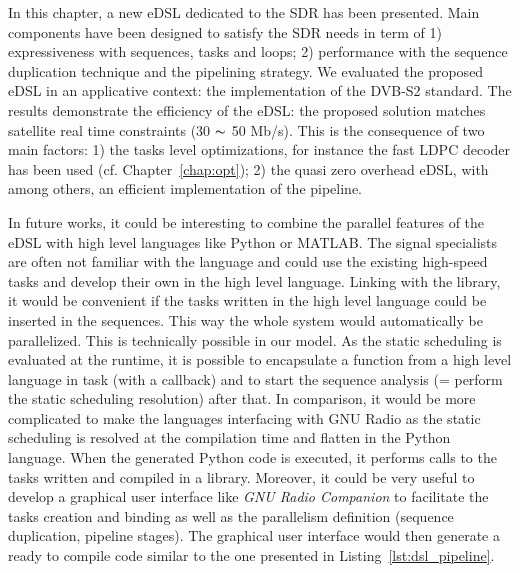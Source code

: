 In this chapter, a new eDSL dedicated to the SDR has been presented. Main
components have been designed to satisfy the SDR needs in term of 1)
expressiveness with sequences, tasks and loops; 2) performance with the sequence
duplication technique and the pipelining strategy. We evaluated the proposed
eDSL in an applicative context: the implementation of the DVB-S2 standard. The
results demonstrate the efficiency of the \AFFECT eDSL: the proposed solution
matches satellite real time constraints (30 $\thicksim$ 50 Mb/s). This is the
consequence of two main factors: 1) the tasks level optimizations, for instance
the fast LDPC decoder has been used (cf. Chapter~\ref{chap:opt}); 2) the quasi
zero overhead eDSL, with among others, an efficient implementation of the
pipeline.

In future works, it could be interesting to combine the parallel features of the
\AFFECT eDSL with high level languages like Python or MATLAB. The signal
specialists are often not familiar with the \Cxx language and could use the
existing high-speed \Cxx tasks and develop their own in the high level language.
Linking with the \AFFECT library, it would be convenient if the tasks written
in the high level language could be inserted in the \AFFECT sequences. This way
the whole system would automatically be parallelized. This is technically
possible in our model. As the static scheduling is evaluated at the runtime, it
is possible to encapsulate a function from a high level language in \AFFECT task
(with a callback) and to start the sequence analysis (= perform the static
scheduling resolution) after that. In comparison, it would be more complicated
to make the languages interfacing with GNU Radio as the static scheduling is
resolved at the compilation time and flatten in the Python language. When the
generated Python code is executed, it performs calls to the tasks written and
compiled in a \Cxx library. Moreover, it could be very useful to develop a
graphical user interface like \emph{GNU Radio Companion} to facilitate the tasks
creation and binding as well as the parallelism definition (sequence
duplication, pipeline stages). The graphical user interface would then generate
a ready to compile \Cxx code similar to the one presented in
Listing~\ref{lst:dsl_pipeline}.